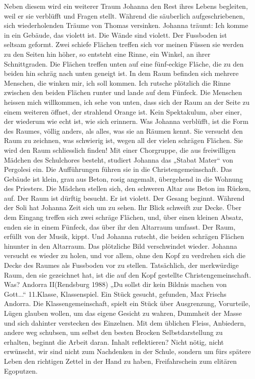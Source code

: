 Neben diesem wird ein weiterer Traum Johanna den Rest ihres Lebens begleiten, weil er sie verblüfft und Fragen stellt. Während die säuberlich aufgeschriebenen, sich wiederholenden Träume von Thomas versinken.
Johanna träumt:
Ich komme in ein Gebäude, das violett ist. Die Wände sind violett. Der Fussboden ist seltsam geformt. Zwei schiefe Flächen treffen sich vor meinen Füssen sie werden zu den Seiten hin höher, so entsteht eine Rinne, ein Winkel, an ihrer Schnittgraden. Die Flächen treffen unten auf eine fünf-eckige Fläche, die zu den beiden hin schräg nach unten geneigt ist. In dem Raum befinden sich mehrere Menschen,  die winken mir, ich soll kommen. Ich rutsche plötzlich die Rinne zwischen den beiden Flächen runter und lande auf dem Fünfeck. Die Menschen heissen mich willkommen, ich sehe von unten, dass sich der Raum an der Seite zu einem weiteren öffnet, der strahlend Orange ist.
 Kein Spektakulum, aber einer, der wiederum wie echt ist, wie sich erinnern. Was Johanna verblüfft, ist die Form des Raumes, völlig anders, als alles, was sie an Räumen kennt. Sie versucht den Raum zu zeichnen, was schwierig ist, wegen all der vielen schrägen Flächen.
Sie wird den Raum schliesslich finden! Mit einer Chorgruppe, die aus freiwilligen Mädchen des Schulchores besteht, studiert Johanna das „Stabat Mater“ von Pergolesi ein. 
Die Aufführungen führen sie in die Christengemeinschaft. Das Gebäude ist klein, grau aus Beton, rosig angemalt, übergehend in die Wohnung des Priesters.
Die Mädchen stellen sich, den schweren Altar aus Beton im Rücken, auf. Der Raum ist dürftig besucht. Er ist violett. Der Gesang beginnt. Während der Soli hat Johanna Zeit sich um zu sehen. Ihr Blick schweift zur Decke. Über dem Eingang treffen sich zwei schräge Flächen, und, über einen kleinen Absatz, enden sie in einem Fünfeck, das über ihr den Altarraum umfasst.
Der Raum, erfüllt von der Musik, kippt. Und Johanna rutscht, die beiden schrägen Flächen hinunter  in den Altarraum. Das plötzliche Bild verschwindet wieder. Johanna versucht es wieder zu holen, und vor allem, ohne den Kopf zu verdrehen sich die Decke des Raumes als Fussboden vor zu stellen. Tatsächlich, der merkwürdige Raum, den sie gezeichnet hat, ist die auf den Kopf gestellte Christengemeinschaft. Was?
 Andorra II(Rendsburg 1988)
„Du sollst dir kein Bildnis machen von Gott...“
11.Klasse, Klassenspiel. Ein Stück gesucht, gefunden, Max Frischs Andorra. Die Klassengemeinschaft, spielt ein Stück über Ausgrenzung, Vorurteile, Lügen glauben wollen, um das eigene Gesicht zu wahren, Dummheit der Masse und sich dahinter verstecken des Einzelnen. Mit dem üblichen Fleiss, Anbiedern, andere weg schubsen, um selbst den besten Brocken Selbstdarstellung zu erhalten, beginnt die Arbeit daran. Inhalt reflektieren? Nicht nötig, nicht erwünscht, wir sind nicht zum Nachdenken in der Schule, sondern um fürs spätere Leben den richtigen Zettel in der Hand zu haben, Freifahrschein zum elitären Egoputzen.
